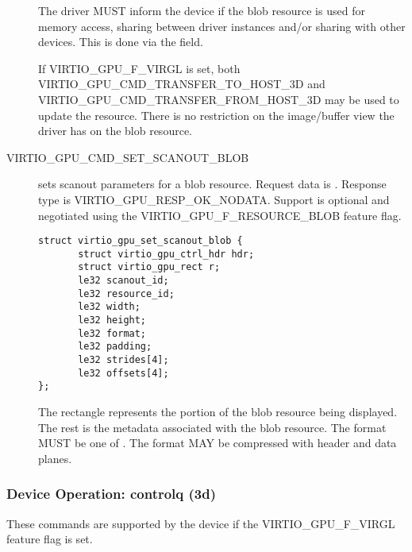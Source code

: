 \begin{description}
The driver MUST inform the device if the blob resource is used for
memory access, sharing between driver instances and/or sharing with
other devices. This is done via the  field.

If VIRTIO_GPU_F_VIRGL is set, both VIRTIO_GPU_CMD_TRANSFER_TO_HOST_3D
and VIRTIO_GPU_CMD_TRANSFER_FROM_HOST_3D may be used to update the
resource. There is no restriction on the image/buffer view the driver
has on the blob resource.

\item[VIRTIO_GPU_CMD_SET_SCANOUT_BLOB] sets scanout parameters for a
   blob resource. Request data is
  . Response type is
  VIRTIO_GPU_RESP_OK_NODATA. Support is optional and negotiated
  using the VIRTIO_GPU_F_RESOURCE_BLOB feature flag.

\begin{lstlisting}
struct virtio_gpu_set_scanout_blob {
       struct virtio_gpu_ctrl_hdr hdr;
       struct virtio_gpu_rect r;
       le32 scanout_id;
       le32 resource_id;
       le32 width;
       le32 height;
       le32 format;
       le32 padding;
       le32 strides[4];
       le32 offsets[4];
};
\end{lstlisting}

The rectangle  represents the portion of the blob resource being
displayed. The rest is the metadata associated with the blob resource. The
format MUST be one of .  The format MAY be
compressed with header and data planes.

\end{description}

\subsubsection{Device Operation: controlq (3d)}\label{sec:Device Types / GPU Device / Device Operation / Device Operation: controlq (3d)}

These commands are supported by the device if the VIRTIO_GPU_F_VIRGL
feature flag is set.


